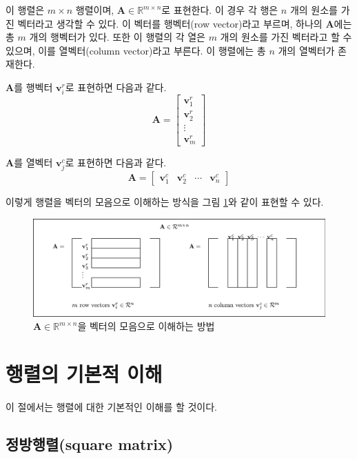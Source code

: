 이 행렬은 $m \times n$ 행렬이며, $\mathbf A \in \mathbb R^{m\times n}$로 표현한다.
이 경우 각 행은 $n$ 개의 원소를 가진 벡터라고 생각할 수 있다. 이 벡터를 행벡터(row vector)라고 부르며,
하나의 $\mathbf A$에는 총 $m$ 개의 행벡터가 있다. 
또한 이 행렬의 각 열은 $m$ 개의 원소를 가진 벡터라고 할 수 있으며, 이를 열벡터(column vector)라고 부른다.
이 행렬에는 총 $n$ 개의 열벡터가 존재한다. 

$\mathbf A$를 행벡터 $\mathbf v_i^r$로 표현하면 다음과 같다.
$$\mathbf A = \left [ 
\begin{array}{c}
\mathbf v_1^r\\
\mathbf v_2^r\\
\vdots\\
\mathbf v_m^r
\end{array}
\right ]$$

$\mathbf A$를 열벡터 $\mathbf v_j^c$로 표현하면 다음과 같다.
$$\mathbf A = \left [ 
\begin{array}{cccc}
\mathbf v_1^c & \mathbf v_2^c & \cdots & \mathbf v_n^c
\end{array}
\right ]$$

이렇게 행렬을 벡터의 모음으로 이해하는 방식을 그림 \ref{fig:matrix:matrixAsVectorCollection}와 같이 표현할 수 있다.
\begin{figure}[h!]
  \centering
    \includegraphics[width=12cm]{Math_matrix/matrixAsVectorCollection.eps}
    \caption{$\mathbf A \in \mathbb R^{m \times n}$을 벡터의 모음으로 이해하는 방법}
    \label{fig:matrix:matrixAsVectorCollection}
\end{figure}

\section{행렬의 기본적 이해}

이 절에서는 행렬에 대한 기본적인 이해를 할 것이다.

\subsection{정방행렬(square matrix)}

